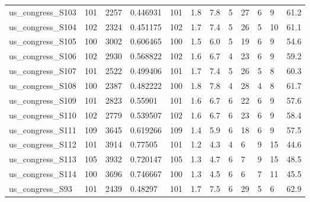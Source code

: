 \begin{longtable}{llllllllllll}
 us\_congress\_S103                                   & 101        & 2257      & 0.446931    & 101   & 1.8    & 7.8    & 5     & 27     & 6      & 9      & 61.2    \\
 us\_congress\_S104                                   & 102        & 2324      & 0.451175    & 102   & 1.7    & 7.4    & 5     & 26     & 5      & 10     & 61.1    \\
 us\_congress\_S105                                   & 100        & 3002      & 0.606465    & 100   & 1.5    & 6.0    & 5     & 19     & 6      & 9      & 54.6    \\
 us\_congress\_S106                                   & 102        & 2930      & 0.568822    & 102   & 1.6    & 6.7    & 4     & 23     & 6      & 9      & 59.2    \\
 us\_congress\_S107                                   & 101        & 2522      & 0.499406    & 101   & 1.7    & 7.4    & 5     & 26     & 5      & 8      & 60.3    \\
 us\_congress\_S108                                   & 100        & 2387      & 0.482222    & 100   & 1.8    & 7.8    & 4     & 28     & 4      & 8      & 61.7    \\
 us\_congress\_S109                                   & 101        & 2823      & 0.55901     & 101   & 1.6    & 6.7    & 6     & 22     & 6      & 9      & 57.6    \\
 us\_congress\_S110                                   & 102        & 2779      & 0.539507    & 102   & 1.6    & 6.7    & 6     & 23     & 6      & 9      & 58.4    \\
 us\_congress\_S111                                   & 109        & 3645      & 0.619266    & 109   & 1.4    & 5.9    & 6     & 18     & 6      & 9      & 57.5    \\
 us\_congress\_S112                                   & 101        & 3914      & 0.77505     & 101   & 1.2    & 4.3    & 4     & 6      & 9      & 15     & 44.6    \\
 us\_congress\_S113                                   & 105        & 3932      & 0.720147    & 105   & 1.3    & 4.7    & 6     & 7      & 9      & 15     & 48.5    \\
 us\_congress\_S114                                   & 100        & 3696      & 0.746667    & 100   & 1.3    & 4.5    & 6     & 6      & 7      & 11     & 45.5    \\
 us\_congress\_S93                                    & 101        & 2439      & 0.48297     & 101   & 1.7    & 7.5    & 6     & 29     & 5      & 6      & 62.9    \\

\end{longtable}

